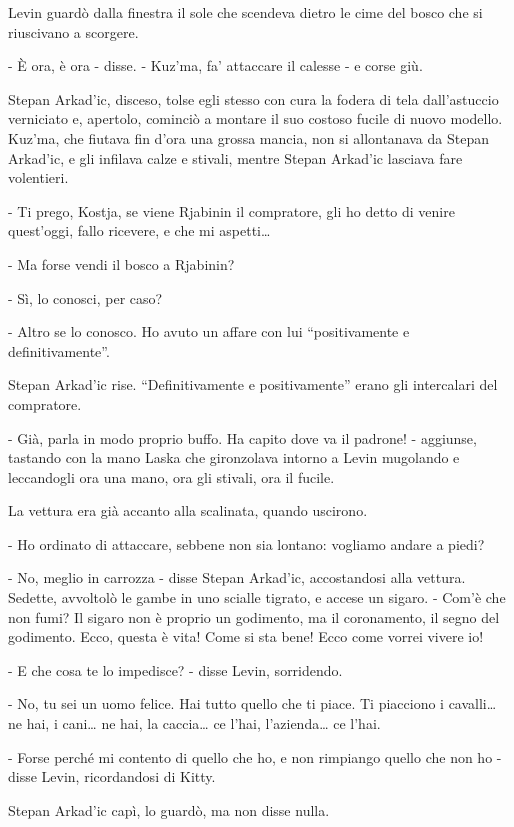 Levin guardò dalla finestra il sole che scendeva dietro le cime del bosco che si riuscivano a scorgere. 

- È ora, è ora - disse. - Kuz'ma, fa' attaccare il calesse - e corse giù. 

Stepan Arkad'ic, disceso, tolse egli stesso con cura la fodera di tela dall'astuccio verniciato e, apertolo, cominciò a montare il suo costoso fucile di nuovo modello. Kuz'ma, che fiutava fin d'ora una grossa mancia, non si allontanava da Stepan Arkad'ic, e gli infilava calze e stivali, mentre Stepan Arkad'ic lasciava fare volentieri. 

- Ti prego, Kostja, se viene Rjabinin il compratore, gli ho detto di venire quest'oggi, fallo ricevere, e che mi aspetti\ldots{} 

- Ma forse vendi il bosco a Rjabinin? 

- Sì, lo conosci, per caso? 

- Altro se lo conosco. Ho avuto un affare con lui ``positivamente e definitivamente''. 

Stepan Arkad'ic rise. ``Definitivamente e positivamente'' erano gli intercalari del compratore. 

- Già, parla in modo proprio buffo. Ha capito dove va il padrone! - aggiunse, tastando con la mano Laska che gironzolava intorno a Levin mugolando e leccandogli ora una mano, ora gli stivali, ora il fucile. 

La vettura era già accanto alla scalinata, quando uscirono. 

- Ho ordinato di attaccare, sebbene non sia lontano: vogliamo andare a piedi? 

- No, meglio in carrozza - disse Stepan Arkad'ic, accostandosi alla vettura. Sedette, avvoltolò le gambe in uno scialle tigrato, e accese un sigaro. - Com'è che non fumi? Il sigaro non è proprio un godimento, ma il coronamento, il segno del godimento. Ecco, questa è vita! Come si sta bene! Ecco come vorrei vivere io! 

- E che cosa te lo impedisce? - disse Levin, sorridendo. 

- No, tu sei un uomo felice. Hai tutto quello che ti piace. Ti piacciono i cavalli\ldots{} ne hai, i cani\ldots{} ne hai, la caccia\ldots{} ce l'hai, l'azienda\ldots{} ce l'hai. 

- Forse perché mi contento di quello che ho, e non rimpiango quello che non ho - disse Levin, ricordandosi di Kitty. 

Stepan Arkad'ic capì, lo guardò, ma non disse nulla. 


